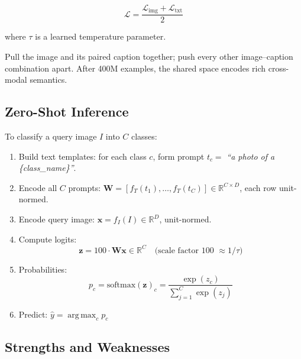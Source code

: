 \documentclass[12pt,a4paper]{article}
\DeclareMathOperator*{\argmax}{arg\,max}
\newcommand{\R}{\mathbb{R}}
\newcommand{\bx}{\mathbf{x}}
\newcommand{\bW}{\mathbf{W}}
\newcommand{\bz}{\mathbf{z}}
\newcommand{\1}{\mathbf{1}}
\begin{document}
\begin{equation}
  \mathcal{L} = \frac{\mathcal{L}_{\text{img}} + \mathcal{L}_{\text{txt}}}{2}
  \label{eq:loss_total}
\end{equation}

where $\tau$ is a learned temperature parameter.

\begin{tcolorbox}[intuitionbox]
Pull the image and its paired caption together; push every other image--caption combination apart.
After 400M examples, the shared space encodes rich cross-modal semantics.
\end{tcolorbox}

\subsection{Zero-Shot Inference}

To classify a query image $I$ into $C$ classes:

\begin{enumerate}[leftmargin=1.5em]
  \item Build text templates: for each class $c$, form prompt $t_c = $ \textit{``a photo of a \{class\_name\}''}.
  \item Encode all $C$ prompts:
    $\bW = [f_T(t_1), \ldots, f_T(t_C)] \in \R^{C \times D}$, each row unit-normed.
  \item Encode query image: $\bx = f_I(I) \in \R^D$, unit-normed.
  \item Compute logits:
    \begin{equation}
      \bz = 100 \cdot \bW \bx \in \R^C
      \quad \text{(scale factor 100 $\approx 1/\tau$)}
      \label{eq:clip_logits}
    \end{equation}
  \item Probabilities:
    \begin{equation}
      p_c = \mathrm{softmax}(\bz)_c = \frac{\exp(z_c)}{\sum_{j=1}^C \exp(z_j)}
      \label{eq:softmax}
    \end{equation}
  \item Predict: $\hat{y} = \argmax_c p_c$
\end{enumerate}

\subsection{Strengths and Weaknesses}
\end{document}
